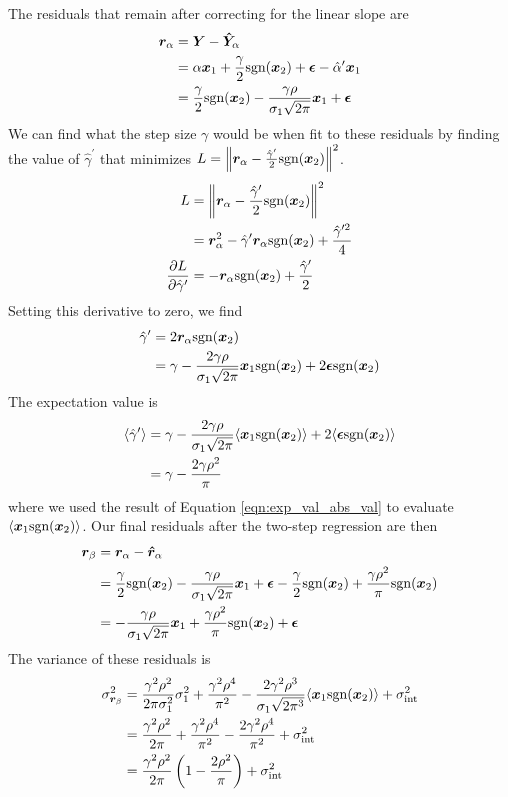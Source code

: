 The residuals that remain after correcting for the linear slope are
\begin{align*}
    \bm{r}_\alpha &= \bm{Y} - \bm{\hat{Y}}_\alpha\\
    &= \alpha\bm{x}_1 + \frac{\gamma}{2}\text{sgn}(\bm{x}_2) +\bm{\epsilon} - \hat{\alpha}^\prime\bm{x}_1\\
    &= \frac{\gamma}{2}\text{sgn}(\bm{x}_2) - \frac{\gamma\rho}{\sigma_1\sqrt{2\pi}}\bm{x}_1 + \bm{\epsilon}
\end{align*}
We can find what the step size $\gamma$ would be when fit to these residuals by finding the value of $\hat{\gamma}^\prime$ that minimizes $L=\left\|\bm{r}_\alpha - \frac{\hat{\gamma}^\prime}{2}\text{sgn}(\bm{x}_2)\right\|^2$.
\begin{align*}
    L &= \left\|\bm{r}_\alpha - \frac{\hat{\gamma}^\prime}{2}\text{sgn}(\bm{x}_2)\right\|^2\\
    &= \bm{r}_\alpha^2 - \hat{\gamma}^\prime\bm{r}_\alpha\text{sgn}(\bm{x}_2) + \frac{\hat{\gamma}^{\prime 2}}{4}\\
    \frac{\partial L}{\partial \hat{\gamma}^\prime} &= -\bm{r}_\alpha\text{sgn}(\bm{x}_2) + \frac{\hat{\gamma}^\prime}{2}
\end{align*}
Setting this derivative to zero, we find
\begin{align*}
    \hat{\gamma}^\prime &= 2\bm{r}_\alpha\text{sgn}(\bm{x}_2)\\
    &= \gamma - \frac{2\gamma\rho}{\sigma_1\sqrt{2\pi}}\bm{x}_1\text{sgn}(\bm{x}_2) + 2\bm{\epsilon}\text{sgn}(\bm{x}_2)
\end{align*}
The expectation value is
\begin{align*}
    \langle\hat{\gamma}^\prime\rangle &= \gamma - \frac{2\gamma\rho}{\sigma_1\sqrt{2\pi}}\langle\bm{x}_1\text{sgn}(\bm{x}_2)\rangle + 2\langle\bm{\epsilon}\text{sgn}(\bm{x}_2)\rangle\\
    &= \gamma - \frac{2\gamma\rho^2}{\pi}
\end{align*}
where we used the result of Equation \ref{eqn:exp_val_abs_val} to evaluate $\langle\bm{x}_1\text{sgn}(\bm{x}_2)\rangle$. Our final residuals after the two-step regression are then
\begin{align*}
    \bm{r}_\beta &= \bm{r}_\alpha - \bm{\hat{r}}_\alpha \\
    &= \frac{\gamma}{2}\text{sgn}(\bm{x}_2) - \frac{\gamma\rho}{\sigma_1\sqrt{2\pi}}\bm{x}_1 + \bm{\epsilon} - \frac{\gamma}{2}\text{sgn}(\bm{x}_2) + \frac{\gamma\rho^2}{\pi}\text{sgn}(\bm{x}_2)\\
    &= -\frac{\gamma\rho}{\sigma_1\sqrt{2\pi}}\bm{x}_1+\frac{\gamma\rho^2}{\pi}\text{sgn}(\bm{x}_2)+\bm{\epsilon}
\end{align*}
The variance of these residuals is
\begin{align*}
    \sigma_{\bm{r}_\beta}^2 &= \frac{\gamma^2\rho^2}{2\pi\sigma_1^2}\sigma_1^2 + \frac{\gamma^2\rho^4}{\pi^2} - \frac{2\gamma^2\rho^3}{\sigma_1\sqrt{2\pi^3}}\langle\bm{x}_1\text{sgn}(\bm{x}_2)\rangle + \sigma_\text{int}^2\\
    &= \frac{\gamma^2\rho^2}{2\pi} + \frac{\gamma^2\rho^4}{\pi^2} - \frac{2\gamma^2\rho^4}{\pi^2} + \sigma_\text{int}^2\\
    &= \frac{\gamma^2\rho^2}{2\pi}\left(1-\frac{2\rho^2}{\pi}\right) + \sigma_\text{int}^2
\end{align*}

